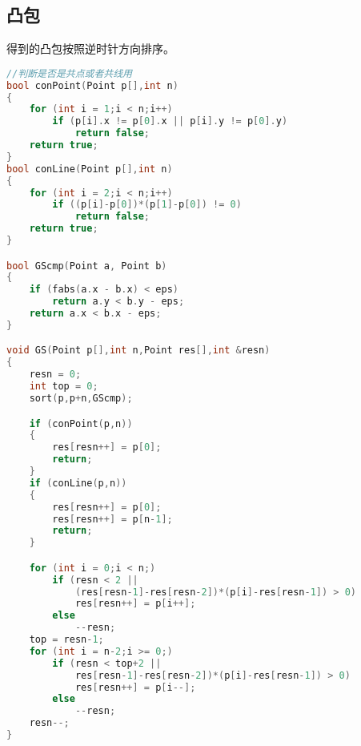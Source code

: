 \subsection{凸包}
	得到的凸包按照逆时针方向排序。
	\begin{lstlisting}[language=c++]
//判断是否是共点或者共线用
bool conPoint(Point p[],int n)
{
	for (int i = 1;i < n;i++)
		if (p[i].x != p[0].x || p[i].y != p[0].y)
			return false;
	return true;
}
bool conLine(Point p[],int n)
{
	for (int i = 2;i < n;i++)
		if ((p[i]-p[0])*(p[1]-p[0]) != 0)
			return false;
	return true;
}

bool GScmp(Point a, Point b)
{
	if (fabs(a.x - b.x) < eps)
		return a.y < b.y - eps;
	return a.x < b.x - eps;
}

void GS(Point p[],int n,Point res[],int &resn)
{
	resn = 0;
	int top = 0;
	sort(p,p+n,GScmp);

	if (conPoint(p,n))
	{
		res[resn++] = p[0];
		return;
	}
	if (conLine(p,n))
	{
		res[resn++] = p[0];
		res[resn++] = p[n-1];
		return;
	}

	for (int i = 0;i < n;)
		if (resn < 2 || 
			(res[resn-1]-res[resn-2])*(p[i]-res[resn-1]) > 0)
			res[resn++] = p[i++];
		else
			--resn;
	top = resn-1;
	for (int i = n-2;i >= 0;)
		if (resn < top+2 || 
			res[resn-1]-res[resn-2])*(p[i]-res[resn-1]) > 0)
			res[resn++] = p[i--];
		else
			--resn;
	resn--;
}
	\end{lstlisting}
	